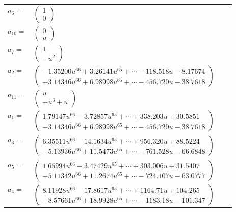 \documentclass[1p]{elsarticle_modified}
\theoremstyle{definition}
\begin{document}
\begin{tabular}{m{7pt} m{180pt} m{7pt} m{180pt} }
\flushright $a_{6}=$&$\begin{pmatrix}1\\0\end{pmatrix}$ \\
\flushright $a_{10}=$&$\begin{pmatrix}0\\u\end{pmatrix}$ \\
\flushright $a_{7}=$&$\begin{pmatrix}1\\- u^2\end{pmatrix}$ \\
\flushright $a_{2}=$&$\begin{pmatrix}-1.35200 u^{66}+3.26141 u^{65}+\cdots-118.518 u-8.17674\\-3.14346 u^{66}+6.98998 u^{65}+\cdots-456.720 u-38.7618\end{pmatrix}$ \\
\flushright $a_{11}=$&$\begin{pmatrix}u\\- u^3+u\end{pmatrix}$ \\
\flushright $a_{1}=$&$\begin{pmatrix}1.79147 u^{66}-3.72857 u^{65}+\cdots+338.203 u+30.5851\\-3.14346 u^{66}+6.98998 u^{65}+\cdots-456.720 u-38.7618\end{pmatrix}$ \\
\flushright $a_{3}=$&$\begin{pmatrix}6.35511 u^{66}-14.1634 u^{65}+\cdots+956.320 u+88.5224\\-5.13936 u^{66}+11.5473 u^{65}+\cdots-761.528 u-66.6848\end{pmatrix}$ \\
\flushright $a_{5}=$&$\begin{pmatrix}1.65994 u^{66}-3.47429 u^{65}+\cdots+303.006 u+31.5407\\-5.11342 u^{66}+11.2674 u^{65}+\cdots-724.107 u-63.0777\end{pmatrix}$ \\
\flushright $a_{4}=$&$\begin{pmatrix}8.11928 u^{66}-17.8617 u^{65}+\cdots+1164.71 u+104.265\\-8.57661 u^{66}+18.9928 u^{65}+\cdots-1183.18 u-101.347\end{pmatrix}$ \\

\end{tabular}
\end{document}
